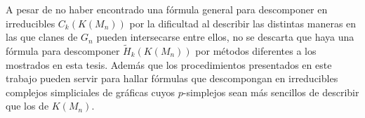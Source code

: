 \documentclass[12pt]{book}
\theoremstyle{definition}
\newcounter{in}
\begin{document}
A pesar de no haber encontrado una fórmula general para descomponer en
irreducibles $C_{k}(K(M_{n}))$ por la dificultad al describir las
distintas maneras en las que clanes de $G_{n}$ pueden intersecarse
entre ellos, no se descarta que haya una fórmula para descomponer
$\widetilde H_{k}(K(M_{n}))$ por métodos diferentes a los mostrados en
esta tesis. Además que los procedimientos presentados en este trabajo
pueden servir para hallar fórmulas que descompongan en irreducibles
complejos simpliciales de gráficas cuyos $p$-simplejos sean más sencillos de describir que los de $K(M_{n})$.
%
\end{document}
